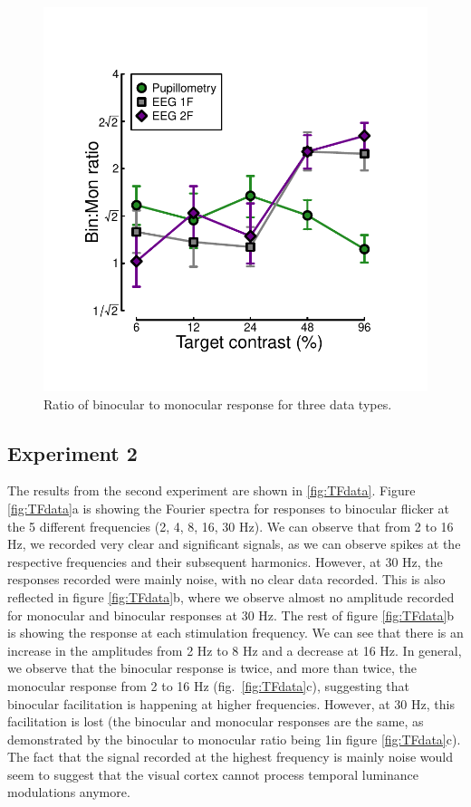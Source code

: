 \documentclass[
]{article}
\begin{document}
\begin{figure}

{\centering \includegraphics{Figures/BSratios} 

}

\caption{Ratio of binocular to monocular response for three data types.}\label{fig:BSratios}
\end{figure}

\hypertarget{experiment-2-1}{%
\subsection{Experiment 2}\label{experiment-2-1}}

The results from the second experiment are shown in \ref{fig:TFdata}. Figure \ref{fig:TFdata}a is showing the Fourier spectra for responses to binocular flicker at the 5 different frequencies (2, 4, 8, 16, 30 Hz). We can observe that from 2 to 16 Hz, we recorded very clear and significant signals, as we can observe spikes at the respective frequencies and their subsequent harmonics. However, at 30 Hz, the responses recorded were mainly noise, with no clear data recorded. This is also reflected in figure \ref{fig:TFdata}b, where we observe almost no amplitude recorded for monocular and binocular responses at 30 Hz. The rest of figure \ref{fig:TFdata}b is showing the response at each stimulation frequency. We can see that there is an increase in the amplitudes from 2 Hz to 8 Hz and a decrease at 16 Hz. In general, we observe that the binocular response is twice, and more than twice, the monocular response from 2 to 16 Hz (fig.~\ref{fig:TFdata}c), suggesting that binocular facilitation is happening at higher frequencies. However, at 30 Hz, this facilitation is lost (the binocular and monocular responses are the same, as demonstrated by the binocular to monocular ratio being 1in figure \ref{fig:TFdata}c). The fact that the signal recorded at the highest frequency is mainly noise would seem to suggest that the visual cortex cannot process temporal luminance modulations anymore.
\end{document}
